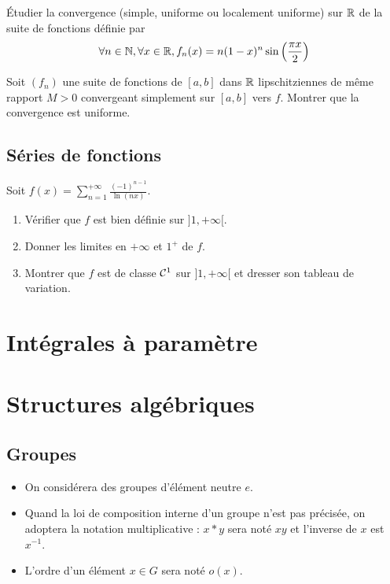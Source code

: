 \documentclass[12pt,a4paper]{exo_book}
\begin{document}
\begin{exo}
    Étudier la convergence (simple, uniforme ou localement uniforme) sur $\mathbb{R}$ de la suite de fonctions définie par
    \[\forall n \in \mathbb{N}, \forall x \in \mathbb{R}, f_n (x) = n (1-x)^n \sin \left(\frac{\pi x}{2}\right)\]
\end{exo}

\begin{exo}
    Soit $(f_n)$ une suite de fonctions de $[a,b]$ dans $\mathbb{R}$ lipschitziennes de même rapport $M > 0$ convergeant simplement sur $[a,b]$ vers $f$. Montrer que la convergence est uniforme.
\end{exo}

\section{Séries de fonctions}

\begin{exo}
    Soit $\displaystyle f(x) = \sum_{n=1}^{+\infty} \frac{(-1)^{n-1}}{\ln(nx)}$.

    \begin{enumerate}
        \item Vérifier que $f$ est bien définie sur $]1, +\infty[$.
        \item Donner les limites en $+\infty$ et $1^+$ de $f$.
        \item Montrer que $f$ est de classe $\mathcal{C}^1$ sur $]1, +\infty[$ et dresser son tableau de variation.
    \end{enumerate}
\end{exo}

\chapter{Intégrales à paramètre}



\chapter{Structures algébriques}

\section{Groupes}

\begin{notation}
\hspace{1pt}
\begin{itemize}
    \item On considérera des groupes d'élément neutre $e$.
    \item Quand la loi de composition interne d'un groupe n'est pas précisée, on adoptera la notation multiplicative : $x * y$ sera noté $xy$ et l'inverse de $x$ est $x^{-1}$.
    \item L'ordre d'un élément $x\in G$ sera noté $o(x)$.
\end{itemize}
\end{notation}
\end{document}

